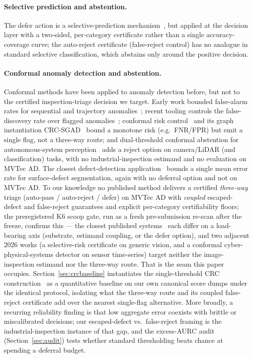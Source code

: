\documentclass[11pt]{article}
\begin{document}
\paragraph{Selective prediction and abstention.} The defer action is a selective-prediction
mechanism~\citep{geifman2017selective}, but applied at the decision layer with a two-sided,
per-category certificate rather than a single accuracy-coverage curve; the auto-reject certificate
(false-reject control) has no analogue in standard selective classification, which abstains only
around the positive decision.

\paragraph{Conformal anomaly detection and abstention.} Conformal methods have been applied to
anomaly detection before, but not to the certified inspection-triage decision we target. Early
work bounded false-alarm rates for sequential and trajectory
anomalies~\citep{laxhammar2011sequential,laxhammar2015inductive}; recent tooling controls the
false-discovery rate over flagged anomalies~\citep{hennhofer2026nonconform}; conformal risk
control~\citep{angelopoulos2022crc} and its graph instantiation
CRC-SGAD~\citep{bai2025crcsgad} bound a monotone risk (e.g.\ FNR/FPR) but emit a single flag, not
a three-way route; and dual-threshold conformal abstention for autonomous-system
perception~\citep{kumar2025beyond} adds a reject option on camera/LiDAR (and classification)
tasks, with no industrial-inspection estimand and no evaluation on MVTec AD. The closest
defect-detection application~\citep{shen2025conformal} bounds a single mean error rate for
surface-defect segmentation, again with no deferral option and not on MVTec AD. To our knowledge
no published method delivers a certified \emph{three-way} triage (auto-pass / auto-reject / defer)
on MVTec AD with \emph{coupled} escaped-defect and false-reject guarantees and explicit
per-category certifiability floors; the preregistered K6 scoop gate, run as a fresh pre-submission
re-scan after the freeze, confirms this --- the closest published
systems~\citep{kumar2025beyond,bai2025crcsgad,shen2025conformal} each differ on a load-bearing axis
(substrate, estimand coupling, or the defer option), and two adjacent 2026 works (a selective-risk
certificate on generic vision, and a conformal cyber-physical-systems detector on sensor
time-series) target neither the image-inspection estimand nor the three-way route. That
is the seam this paper occupies. Section~\ref{sec:crcbaseline} instantiates the single-threshold
CRC construction~\citep{angelopoulos2022crc} as a quantitative baseline on our own canonical score
dumps under the identical protocol, isolating what the three-way route and its coupled
false-reject certificate add over the nearest single-flag alternative. More broadly, a recurring
reliability finding is that low
aggregate error coexists with brittle or miscalibrated decisions; our escaped-defect vs.\
false-reject framing is the industrial-inspection instance of that gap, and the excess-AURC audit
(Section~\ref{sec:audit}) tests whether standard thresholding beats chance at spending a deferral
budget.
\end{document}
